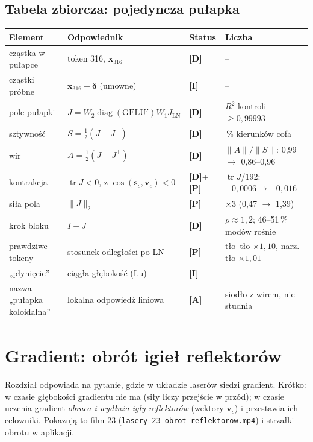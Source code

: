 \documentclass[a4paper,11pt]{article}
\newcommand{\stD}{\textcolor{dok}{\textsf{\textbf{[D]}}}}
\newcommand{\stP}{\textcolor{pom}{\textsf{\textbf{[P]}}}}
\newcommand{\stI}{\textcolor{ilu}{\textsf{\textbf{[I]}}}}
\newcommand{\stA}{\textcolor{ana}{\textsf{\textbf{[A]}}}}
\newcommand{\LN}{\mathrm{LN}}
\newcommand{\GELU}{\mathrm{GELU}}
\newcommand{\tr}{\operatorname{tr}}
\begin{document}
\subsection*{Tabela zbiorcza: pojedyncza pułapka}
\begin{longtable}{>{\raggedright\arraybackslash}p{3.1cm}>{\raggedright\arraybackslash}p{5.9cm}>{\raggedright\arraybackslash}p{1.4cm}>{\raggedright\arraybackslash}p{4.6cm}}
\toprule
\textbf{Element} & \textbf{Odpowiednik} & \textbf{Status} & \textbf{Liczba}\\\midrule\endhead
cząstka w pułapce & token 316, $\bm x_{316}$ & \stD & --\\
cząstki próbne & $\bm x_{316}+\bm\delta$ (umowne) & \stI & --\\
pole pułapki & $J=W_2\operatorname{diag}(\GELU')W_1J_{\LN}$ & \stD & $R^2$ kontroli $\ge0{,}99993$\\
sztywność & $S=\tfrac12(J+J^{\!\top})$ & \stD & 51\,\% kierunków cofa\\
wir & $A=\tfrac12(J-J^{\!\top})$ & \stD & $\lVert A\rVert/\lVert S\rVert$: 0,99 $\to$ 0,86--0,96\\
kontrakcja & $\tr J<0$, z $\cos(\bm s_c,\bm v_c)<0$ & \stD+\stP & $\tr J/192$: $-0{,}0006\to-0{,}016$\\
siła pola & $\lVert J\rVert_2$ & \stP & $\times3$ (0,47 $\to$ 1,39)\\
krok bloku & $I+J$ & \stD & $\rho\approx1{,}2$; 46--51\,\% modów rośnie\\
prawdziwe tokeny & stosunek odległości po LN & \stP & tło--tło $\times1{,}10$, narz.--tło $\times1{,}01$\\
„płynięcie” & ciągła głębokość (Lu) & \stI & --\\
nazwa „pułapka koloidalna” & lokalna odpowiedź liniowa & \stA & siodło z wirem, nie studnia\\
\bottomrule
\end{longtable}

\section{Gradient: obrót igieł reflektorów}\label{sec:gradient}
Rozdział odpowiada na pytanie, gdzie w układzie laserów siedzi gradient. Krótko: w czasie głębokości gradientu nie ma (siły liczy
przejście w przód); w czasie uczenia gradient \emph{obraca i wydłuża igły reflektorów} (wektory $\bm v_c$) i przestawia ich celowniki.
Pokazują to film 23 (\texttt{lasery\_23\_obrot\_reflektorow.mp4}) i strzałki obrotu w aplikacji.
\end{document}
